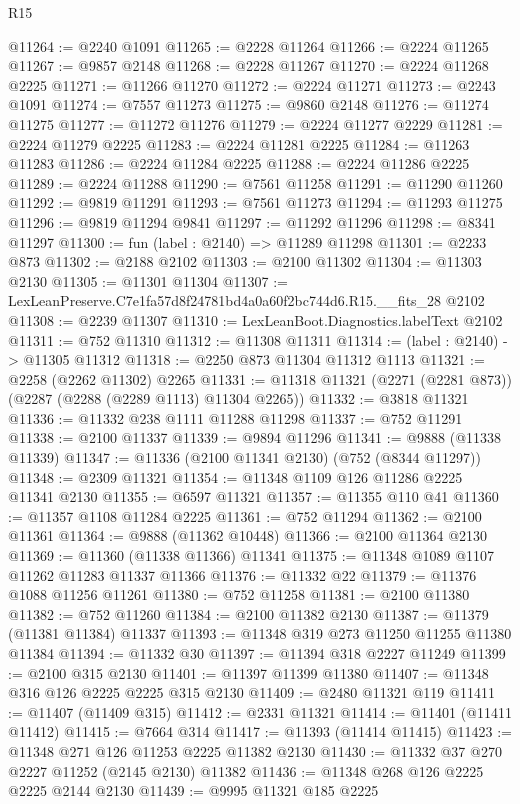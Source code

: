 \begin{lexlean}{R15}
\begin{coremodule}
@11264 := @2240 @1091
@11265 := @2228 @11264
@11266 := @2224 @11265
@11267 := @9857 @2148
@11268 := @2228 @11267
@11270 := @2224 @11268 @2225
@11271 := @11266 @11270
@11272 := @2224 @11271
@11273 := @2243 @1091
@11274 := @7557 @11273
@11275 := @9860 @2148
@11276 := @11274 @11275
@11277 := @11272 @11276
@11279 := @2224 @11277 @2229
@11281 := @2224 @11279 @2225
@11283 := @2224 @11281 @2225
@11284 := @11263 @11283
@11286 := @2224 @11284 @2225
@11288 := @2224 @11286 @2225
@11289 := @2224 @11288
@11290 := @7561 @11258
@11291 := @11290 @11260
@11292 := @9819 @11291
@11293 := @7561 @11273
@11294 := @11293 @11275
@11296 := @9819 @11294 @9841
@11297 := @11292 @11296
@11298 := @8341 @11297
@11300 := fun (label : @2140) => @11289 @11298
@11301 := @2233 @873
@11302 := @2188 @2102
@11303 := @2100 @11302
@11304 := @11303 @2130
@11305 := @11301 @11304
@11307 := LexLeanPreserve.C7e1fa57d8f24781bd4a0a60f2bc744d6.R15.__fits_28 @2102
@11308 := @2239 @11307
@11310 := LexLeanBoot.Diagnostics.labelText @2102
@11311 := @752 @11310
@11312 := @11308 @11311
@11314 := (label : @2140) -> @11305 @11312
@11318 := @2250 @873 @11304 @11312 @1113
@11321 := @2258 (@2262 @11302) @2265
@11331 := @11318 @11321 (@2271 (@2281 @873)) (@2287 (@2288 (@2289 @1113) @11304 @2265))
@11332 := @3818 @11321
@11336 := @11332 @238 @1111 @11288 @11298
@11337 := @752 @11291
@11338 := @2100 @11337
@11339 := @9894 @11296
@11341 := @9888 (@11338 @11339)
@11347 := @11336 (@2100 @11341 @2130) (@752 (@8344 @11297))
@11348 := @2309 @11321
@11354 := @11348 @1109 @126 @11286 @2225 @11341 @2130
@11355 := @6597 @11321
@11357 := @11355 @110 @41
@11360 := @11357 @1108 @11284 @2225
@11361 := @752 @11294
@11362 := @2100 @11361
@11364 := @9888 (@11362 @10448)
@11366 := @2100 @11364 @2130
@11369 := @11360 (@11338 @11366) @11341
@11375 := @11348 @1089 @1107 @11262 @11283 @11337 @11366
@11376 := @11332 @22
@11379 := @11376 @1088 @11256 @11261
@11380 := @752 @11258
@11381 := @2100 @11380
@11382 := @752 @11260
@11384 := @2100 @11382 @2130
@11387 := @11379 (@11381 @11384) @11337
@11393 := @11348 @319 @273 @11250 @11255 @11380 @11384
@11394 := @11332 @30
@11397 := @11394 @318 @2227 @11249
@11399 := @2100 @315 @2130
@11401 := @11397 @11399 @11380
@11407 := @11348 @316 @126 @2225 @2225 @315 @2130
@11409 := @2480 @11321 @119
@11411 := @11407 (@11409 @315)
@11412 := @2331 @11321
@11414 := @11401 (@11411 @11412)
@11415 := @7664 @314
@11417 := @11393 (@11414 @11415)
@11423 := @11348 @271 @126 @11253 @2225 @11382 @2130
@11430 := @11332 @37 @270 @2227 @11252 (@2145 @2130) @11382
@11436 := @11348 @268 @126 @2225 @2225 @2144 @2130
@11439 := @9995 @11321 @185 @2225

\end{coremodule}
\end{lexlean}
